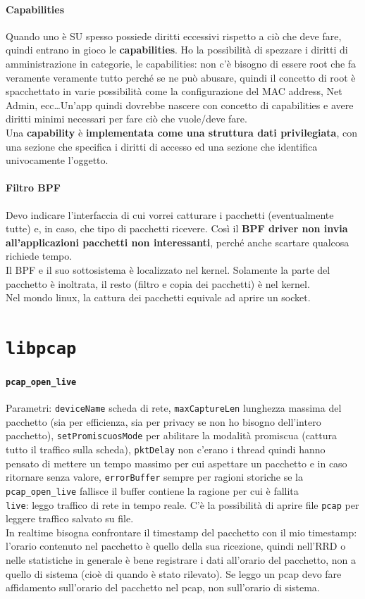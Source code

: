 \documentclass[10pt]{book}
\begin{document}
\paragraph{Capabilities} Quando uno è SU spesso possiede diritti eccessivi rispetto a ciò che deve fare, quindi entrano in gioco le \textbf{capabilities}. Ho la possibilità di spezzare i diritti di amministrazione in categorie, le capabilities: non c'è bisogno di essere root che fa veramente veramente tutto perché se ne può abusare, quindi il concetto di root è spacchettato in varie possibilità come la configurazione del MAC address, Net Admin, ecc\ldots Un'app quindi dovrebbe nascere con concetto di capabilities e avere diritti minimi necessari per fare ciò che vuole/deve fare.\\
Una \textbf{capability} è \textbf{implementata come una struttura dati privilegiata}, con una sezione che specifica i diritti di accesso ed una sezione che identifica univocamente l'oggetto.
\paragraph{Filtro BPF} Devo indicare l'interfaccia di cui vorrei catturare i pacchetti (eventualmente tutte) e, in caso, che tipo di pacchetti ricevere. Così il \textbf{BPF driver non invia all'applicazioni pacchetti non interessanti}, perché anche scartare qualcosa richiede tempo.\\
Il BPF e il suo sottosistema è localizzato nel kernel. Solamente la parte del pacchetto è inoltrata, il resto (filtro e copia dei pacchetti) è nel kernel.\\
Nel mondo linux, la cattura dei pacchetti equivale ad aprire un socket.
\section{\texttt{libpcap}}
\paragraph{\texttt{pcap\_open\_live}} Parametri: \texttt{deviceName} scheda di rete, \texttt{maxCaptureLen} lunghezza massima del pacchetto (sia per efficienza, sia per privacy se non ho bisogno dell'intero pacchetto), \texttt{setPromiscuosMode} per abilitare la modalità promiscua (cattura tutto il traffico sulla scheda), \texttt{pktDelay} non c'erano i thread quindi hanno pensato di mettere un tempo massimo per cui aspettare un pacchetto e in caso ritornare senza valore, \texttt{errorBuffer} sempre per ragioni storiche se la \texttt{pcap\_open\_live} fallisce il buffer contiene la ragione per cui è fallita\\
\texttt{live}: leggo traffico di rete in tempo reale. C'è la possibilità di aprire file \texttt{pcap} per leggere traffico salvato su file.\\
In realtime bisogna confrontare il timestamp del pacchetto con il mio timestamp: l'orario contenuto nel pacchetto è quello della sua ricezione, quindi nell'RRD o nelle statistiche in generale è bene registrare i dati all'orario del pacchetto, non a quello di sistema (cioè di quando è stato rilevato). Se leggo un pcap devo fare affidamento sull'orario del pacchetto nel pcap, non sull'orario di sistema.
\end{document}
